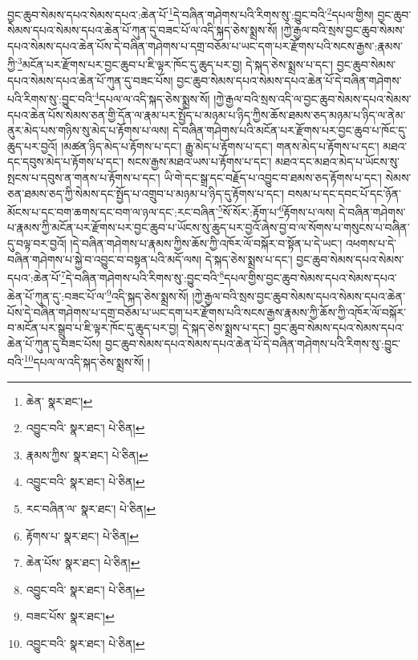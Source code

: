 བྱང་ཆུབ་སེམས་དཔའ་སེམས་དཔའ་:ཆེན་པོ་\footnote{ཆེན་  སྣར་ཐང་། }དེ་བཞིན་གཤེགས་པའི་རིགས་སུ་:བྱུང་བའི་\footnote{འབྱུང་བའི་  སྣར་ཐང་།  པེ་ཅིན། }དཔལ་གྱིས། བྱང་ཆུབ་སེམས་དཔའ་སེམས་དཔའ་ཆེན་པོ་ཀུན་དུ་བཟང་པོ་ལ་འདི་སྐད་ཅེས་སྨྲས་སོ། །ཀྱེ་རྒྱལ་བའི་སྲས་བྱང་ཆུབ་སེམས་དཔའ་སེམས་དཔའ་ཆེན་པོས་དེ་བཞིན་གཤེགས་པ་དགྲ་བཅོམ་པ་ཡང་དག་པར་རྫོགས་པའི་སངས་རྒྱས་:རྣམས་ཀྱི་\footnote{རྣམས་ཀྱིས་  སྣར་ཐང་།  པེ་ཅིན། }མངོན་པར་རྫོགས་པར་བྱང་ཆུབ་པ་ཇི་ལྟར་ཁོང་དུ་ཆུད་པར་བྱ། དེ་སྐད་ཅེས་སྨྲས་པ་དང་། བྱང་ཆུབ་སེམས་དཔའ་སེམས་དཔའ་ཆེན་པོ་ཀུན་དུ་བཟང་པོས། བྱང་ཆུབ་སེམས་དཔའ་སེམས་དཔའ་ཆེན་པོ་དེ་བཞིན་གཤེགས་པའི་རིགས་སུ་:བྱུང་བའི་\footnote{འབྱུང་བའི་  སྣར་ཐང་།  པེ་ཅིན། }དཔལ་ལ་འདི་སྐད་ཅེས་སྨྲས་སོ། །ཀྱེ་རྒྱལ་བའི་སྲས་འདི་ལ་བྱང་ཆུབ་སེམས་དཔའ་སེམས་དཔའ་ཆེན་པོས་སེམས་ཅན་གྱི་དོན་ལ་རྣམ་པར་སྤྱོད་པ་མཉམ་པ་ཉིད་ཀྱིས་ཆོས་ཐམས་ཅད་མཉམ་པ་ཉིད་ལ་ནེམ་ནུར་མེད་པས་གཉིས་སུ་མེད་པ་རྟོགས་པ་ལས། དེ་བཞིན་གཤེགས་པའི་མངོན་པར་རྫོགས་པར་བྱང་ཆུབ་པ་ཁོང་དུ་ཆུད་པར་བྱའོ། །མཚན་ཉིད་མེད་པ་རྟོགས་པ་དང་། རྒྱུ་མེད་པ་རྟོགས་པ་དང་། གནས་མེད་པ་རྟོགས་པ་དང་། མཐའ་དང་དབུས་མེད་པ་རྟོགས་པ་དང་། སངས་རྒྱས་མཐའ་ཡས་པ་རྟོགས་པ་དང་། མཐའ་དང་མཐའ་མེད་པ་ཡོངས་སུ་སྤངས་པ་དབུས་ན་གནས་པ་རྟོགས་པ་དང་། ཡི་གེ་དང་སྒྲ་དང་བརྗོད་པ་འབྱུང་བ་ཐམས་ཅད་རྟོགས་པ་དང་། སེམས་ཅན་ཐམས་ཅད་ཀྱི་སེམས་དང་སྤྱོད་པ་འགྲུབ་པ་མཉམ་པ་ཉིད་དུ་རྟོགས་པ་དང་། བསམ་པ་དང་དབང་པོ་དང་ཉོན་མོངས་པ་དང་བག་ཆགས་དང་བག་ལ་ཉལ་དང་:རང་བཞིན་\footnote{རང་བཞིན་ལ་  སྣར་ཐང་།  པེ་ཅིན། }སོ་སོར་:རྟོག་པ་\footnote{རྟོགས་པ་  སྣར་ཐང་།  པེ་ཅིན། }རྟོགས་པ་ལས། དེ་བཞིན་གཤེགས་པ་རྣམས་ཀྱི་མངོན་པར་རྫོགས་པར་བྱང་ཆུབ་པ་ཡོངས་སུ་ཆུད་པར་བྱའོ་ཞེས་བྱ་བ་ལ་སོགས་པ་གསུངས་པ་བཞིན་དུ་བལྟ་བར་བྱའོ། །དེ་བཞིན་གཤེགས་པ་རྣམས་ཀྱིས་ཆོས་ཀྱི་འཁོར་ལོ་བསྐོར་བ་སྟོན་པ་དེ་ཡང་། འཕགས་པ་དེ་བཞིན་གཤེགས་པ་སྐྱེ་བ་འབྱུང་བ་བསྟན་པའི་མདོ་ལས། དེ་སྐད་ཅེས་སྨྲས་པ་དང་། བྱང་ཆུབ་སེམས་དཔའ་སེམས་དཔའ་:ཆེན་པོ་\footnote{ཆེན་པོས་  སྣར་ཐང་།  པེ་ཅིན། }དེ་བཞིན་གཤེགས་པའི་རིགས་སུ་:བྱུང་བའི་\footnote{འབྱུང་བའི་  སྣར་ཐང་།  པེ་ཅིན། }དཔལ་གྱིས་བྱང་ཆུབ་སེམས་དཔའ་སེམས་དཔའ་ཆེན་པོ་ཀུན་དུ་:བཟང་པོ་ལ་\footnote{བཟང་པོས་  སྣར་ཐང་། }འདི་སྐད་ཅེས་སྨྲས་སོ། །ཀྱེ་རྒྱལ་བའི་སྲས་བྱང་ཆུབ་སེམས་དཔའ་སེམས་དཔའ་ཆེན་པོས་དེ་བཞིན་གཤེགས་པ་དགྲ་བཅོམ་པ་ཡང་དག་པར་རྫོགས་པའི་སངས་རྒྱས་རྣམས་ཀྱི་ཆོས་ཀྱི་འཁོར་ལོ་བསྐོར་བ་མངོན་པར་སྒྲུབ་པ་ཇི་ལྟར་ཁོང་དུ་ཆུད་པར་བྱ། དེ་སྐད་ཅེས་སྨྲས་པ་དང་། བྱང་ཆུབ་སེམས་དཔའ་སེམས་དཔའ་ཆེན་པོ་ཀུན་དུ་བཟང་པོས། བྱང་ཆུབ་སེམས་དཔའ་སེམས་དཔའ་ཆེན་པོ་དེ་བཞིན་གཤེགས་པའི་རིགས་སུ་:བྱུང་བའི་\footnote{འབྱུང་བའི་  སྣར་ཐང་།  པེ་ཅིན། }དཔལ་ལ་འདི་སྐད་ཅེས་སྨྲས་སོ། །
